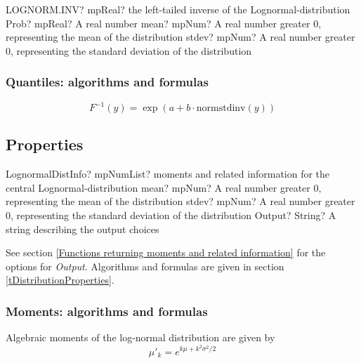 \vspace{0.6cm}
\begin{mpFunctionsExtract}
	\mpWorksheetFunctionThreeNotImplemented
	{LOGNORM.INV? mpReal? the left-tailed inverse of the Lognormal-distribution}
	{Prob? mpReal? A real number}
	{mean? mpNum? A real number greater 0, representing the mean of the distribution}
	{stdev? mpNum? A real number greater 0, representing the standard deviation of the distribution}
\end{mpFunctionsExtract}


\subsubsection{Quantiles: algorithms and formulas}

\begin{equation} 
	F^{-1}(y)= \exp(a+b \cdot \text{normstdinv}(y))
\end{equation}



\subsection{Properties}
\label{LognormalDistributionProperties}


\begin{mpFunctionsExtract}
	\mpFunctionThreeNotImplemented
	{LognormalDistInfo? mpNumList? moments and related information for the central Lognormal-distribution}
	{mean? mpNum? A real number greater 0, representing the mean of the distribution}
	{stdev? mpNum? A real number greater 0, representing the standard deviation of the distribution}
	{Output? String? A string describing the output choices}
\end{mpFunctionsExtract}

\vspace{0.3cm}

See section \ref{Functions returning moments and related information} for the options for {\itshape\sffamily Output}. Algorithms and formulas are given in section \ref{tDistributionProperties}.




\subsubsection{Moments: algorithms and formulas}
Algebraic moments of the log-normal distribution are given by
\begin{equation} 
	\mu'_k= e^{k\mu+k^2\sigma^2 /2}
\end{equation}


